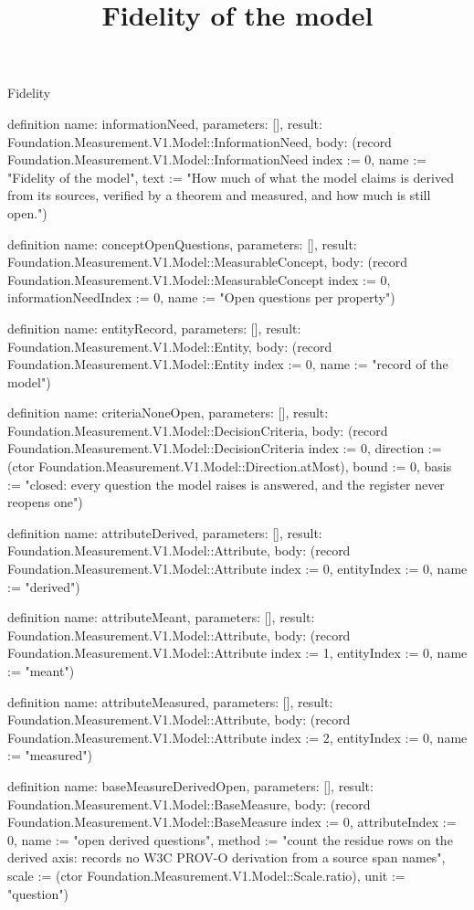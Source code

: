 \begin{lexlean}{Fidelity}
\title{Fidelity of the model}
\begin{semanticmodule}
definition{
  name: informationNeed,
  parameters: [],
  result: Foundation.Measurement.V1.Model::InformationNeed,
  body: (record Foundation.Measurement.V1.Model::InformationNeed {index := 0, name := "Fidelity of the model", text := "How much of what the model claims is derived from its sources, verified by a theorem and measured, and how much is still open."})
}

definition{
  name: conceptOpenQuestions,
  parameters: [],
  result: Foundation.Measurement.V1.Model::MeasurableConcept,
  body: (record Foundation.Measurement.V1.Model::MeasurableConcept {index := 0, informationNeedIndex := 0, name := "Open questions per property"})
}

definition{
  name: entityRecord,
  parameters: [],
  result: Foundation.Measurement.V1.Model::Entity,
  body: (record Foundation.Measurement.V1.Model::Entity {index := 0, name := "record of the model"})
}

definition{
  name: criteriaNoneOpen,
  parameters: [],
  result: Foundation.Measurement.V1.Model::DecisionCriteria,
  body: (record Foundation.Measurement.V1.Model::DecisionCriteria {index := 0, direction := (ctor Foundation.Measurement.V1.Model::Direction.atMost), bound := 0, basis := "closed: every question the model raises is answered, and the register never reopens one"})
}

definition{
  name: attributeDerived,
  parameters: [],
  result: Foundation.Measurement.V1.Model::Attribute,
  body: (record Foundation.Measurement.V1.Model::Attribute {index := 0, entityIndex := 0, name := "derived"})
}

definition{
  name: attributeMeant,
  parameters: [],
  result: Foundation.Measurement.V1.Model::Attribute,
  body: (record Foundation.Measurement.V1.Model::Attribute {index := 1, entityIndex := 0, name := "meant"})
}

definition{
  name: attributeMeasured,
  parameters: [],
  result: Foundation.Measurement.V1.Model::Attribute,
  body: (record Foundation.Measurement.V1.Model::Attribute {index := 2, entityIndex := 0, name := "measured"})
}

definition{
  name: baseMeasureDerivedOpen,
  parameters: [],
  result: Foundation.Measurement.V1.Model::BaseMeasure,
  body: (record Foundation.Measurement.V1.Model::BaseMeasure {index := 0, attributeIndex := 0, name := "open derived questions", method := "count the residue rows on the derived axis: records no W3C PROV-O derivation from a source span names", scale := (ctor Foundation.Measurement.V1.Model::Scale.ratio), unit := "question"})
}


\end{semanticmodule}
\end{lexlean}
